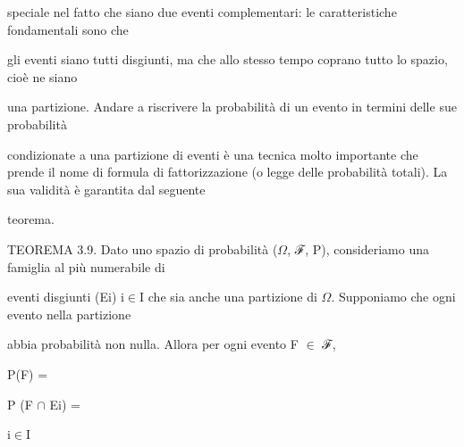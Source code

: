 \documentclass[a4paper,portrait,12pt]{article}
\begin{document}
\begin{flushleft}
speciale nel fatto che siano due eventi complementari: le caratteristiche fondamentali sono che
\end{flushleft}


\begin{flushleft}
gli eventi siano tutti disgiunti, ma che allo stesso tempo coprano tutto lo spazio, cio\`{e} ne siano
\end{flushleft}


\begin{flushleft}
una partizione. Andare a riscrivere la probabilit\`{a} di un evento in termini delle sue probabilit\`{a}
\end{flushleft}


\begin{flushleft}
condizionate a una partizione di eventi \`{e} una tecnica molto importante che prende il nome di formula di fattorizzazione (o legge delle probabilit\`{a} totali). La sua validit\`{a} \`{e} garantita dal seguente
\end{flushleft}


\begin{flushleft}
teorema.
\end{flushleft}


\begin{flushleft}
TEOREMA 3.9. Dato uno spazio di probabilit\`{a} ($\Omega$, ℱ, P), consideriamo una famiglia al più numerabile di
\end{flushleft}


\begin{flushleft}
eventi disgiunti (Ei) i$\in$I che sia anche una partizione di $\Omega$. Supponiamo che ogni evento nella partizione
\end{flushleft}


\begin{flushleft}
abbia probabilit\`{a} non nulla. Allora per ogni evento F $\in$ ℱ,
\end{flushleft}


\begin{flushleft}
P(F) =
\end{flushleft}





\begin{flushleft}
P (F $\cap$ Ei) =
\end{flushleft}


\begin{flushleft}
i$\in$I
\end{flushleft}
\end{document}
